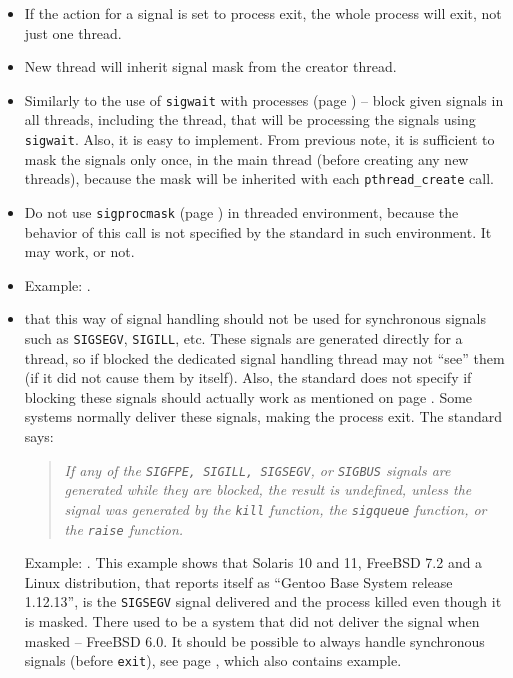 \begin{itemize}
\item If the action for a signal is set to process exit, the whole process
will exit, not just one thread.
\item New thread will inherit signal mask from the creator thread.
\item Similarly to the use of \texttt{sigwait} with processes (page
\pageref{SIGWAIT}) -- block given signals in all threads, including the
thread, that will be processing the signals using \texttt{sigwait}.
 Also, it is easy to implement. From previous note, it is sufficient
to mask the signals only once, in the main thread (before creating any new
threads), because the mask will be inherited with each \texttt{pthread\_create}
call.
\item Do not use \texttt{sigprocmask} (page \pageref{SIGPROCMASK}) in threaded
environment, because the behavior of this call is not specified by the standard
in such environment. It may work, or not.
\item \label{THREADS_SIGWAIT} Example: .
\item {} that this way of signal handling should not be used for
synchronous signals such as \texttt{SIGSEGV}, \texttt{SIGILL}, etc. These
signals are generated directly for a thread, so if blocked the dedicated signal
handling thread may not ``see'' them (if it did not cause them by itself).
Also, the standard does not specify if blocking these signals should actually
work as mentioned on page \pageref{SPECIALSIGNALS}. Some systems
normally deliver these signals, making the process exit. The standard says:

\begin{quote}
\emph{If any of the \texttt{SIGFPE, SIGILL, SIGSEGV}, or \texttt{SIGBUS} signals
are generated while they are blocked, the result is undefined, unless the signal
was generated by the \texttt{kill} function, the \texttt{sigqueue} function, or
the \texttt{raise} function.}
\end{quote}

Example: . This example shows that
Solaris 10 and 11, FreeBSD 7.2 and a Linux distribution, that reports
itself as ``Gentoo Base System release 1.12.13'', is the \texttt{SIGSEGV} signal
delivered and the process killed even though it is masked.
There used to be a system that did not deliver the signal when masked
-- FreeBSD 6.0. It should be possible to always handle synchronous signals
(before \texttt{exit}), see page \pageref{SPECIALSIGNALS}, which also
contains example.

\end{itemize}


